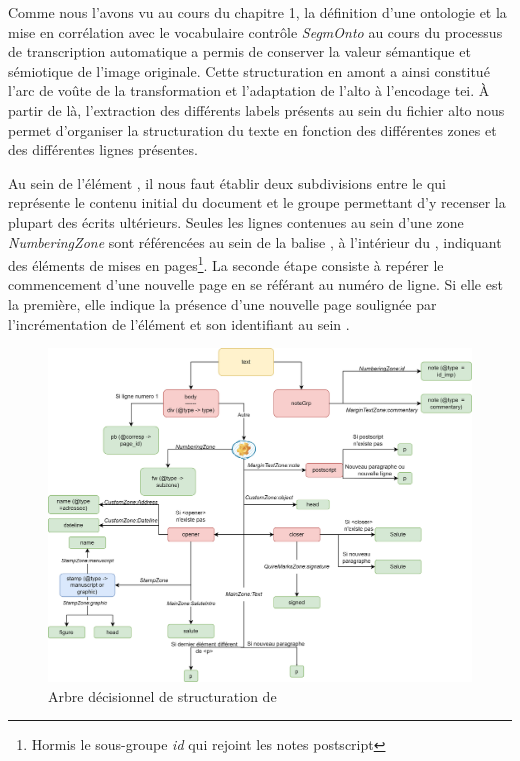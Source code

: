 	Comme nous l'avons vu au cours du chapitre 1, la définition d'une ontologie et la mise en corrélation avec le vocabulaire contrôle \textit{SegmOnto} au cours du processus de transcription automatique a permis de conserver la valeur sémantique et sémiotique de l'image originale. Cette structuration en amont a ainsi constitué l'arc de voûte de la transformation et l'adaptation de l'\gls{alto} à l'encodage \gls{tei}. À partir de là, l'extraction des différents labels présents au sein du fichier \gls{alto} nous permet d'organiser la structuration du texte en fonction des différentes zones et des différentes lignes présentes.
	
	Au sein de l'élément , il nous faut établir deux subdivisions entre le  qui représente le contenu initial du document et le groupe  permettant d'y recenser la plupart des écrits ultérieurs. Seules les lignes contenues au sein d'une zone \textit{NumberingZone} sont référencées au sein de la balise , à l'intérieur du , indiquant des éléments de mises en pages\footnote{Hormis le sous-groupe \textit{id} qui rejoint les notes postscript}. La seconde étape consiste à repérer le commencement d'une nouvelle page en se référant au numéro de ligne. Si elle est la première, elle indique la présence d'une nouvelle page soulignée par l'incrémentation de l'élément  et son identifiant au sein .
	
	\begin{figure}
	    \centering
	    \includegraphics[width=1\textwidth]{annexes/schema/decision_body.png}
	    \caption{Arbre décisionnel de structuration de }
	    \label{fig:arbre_texte}
	\end{figure}
	

